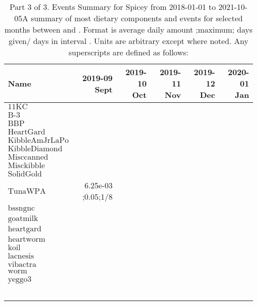 \begin{table}[H]
\centering
\begin{tabular}{|l|r|r|r|r|r|}
\hline
Name&2019-09 Sept&2019-10 Oct&2019-11 Nov&2019-12 Dec&2020-01 Jan\\
\hline
$\textrm{11KC}$&&&&&\\
$\textrm{B-3}$&&&&&\\
$\textrm{BBP}$&&&&&\\
$\textrm{HeartGard}$&&&&&\\
$\textrm{KibbleAmJrLaPo}$&&&&&\\
$\textrm{KibbleDiamond}$&&&&&\\
$\textrm{Misccanned}$&&&&&\\
$\textrm{Misckibble}$&&&&&\\
$\textrm{SolidGold}$&&&&&\\
$\textrm{TunaWPA}$&6.25e-03 ;0.05;1/8&&&&\\
$\textrm{bssngnc}$&&&&&\\
$\textrm{goatmilk}$&&&&&\\
$\textrm{heartgard}$&&&&&\\
$\textrm{heartworm}$&&&&&\\
$\textrm{koil}$&&&&&\\
$\textrm{lacnesis}$&&&&&\\
$\textrm{vibactra}$&&&&&\\
$\textrm{worm}$&&&&&\\
$\textrm{yeggo3}$&&&&&\\
&&&&&\\
&&&&&\\
&&&&&\\
&&&&&\\
&&&&&\\
\hline
\end{tabular}
\caption{Part 3 of 3.  Events Summary for Spicey   from 2018-01-01 to 2021-10-05A summary of most dietary components and events  for selected months between \mjmdatemin and \mjmdatemax. Format is average daily amount ;maximum; days given/ days in interval . Units are arbitrary except where noted. Any  superscripts are defined as follows:  \mjmsuperscripts}
\end{table}
